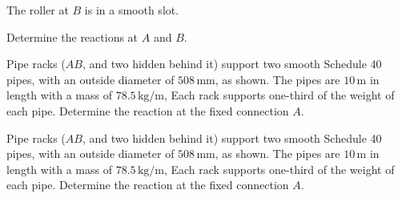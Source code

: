 \documentclass[9pt, xcolor={svgnames, x11names},professionalfonts]{beamer}
\def\scale{1}
\begin{document}
\begin{frame}{}
	\begin{myexam}{}{}
		\def\scale{0.55}
		
		\parb\centering
		The roller at $B$ is in a smooth slot.\par
		Determine the reactions at $A$ and $B$.
	\end{myexam}
\end{frame}
\begin{frame}{}
	\begin{myexer}{}{}
		\centering
		\def\scale{1}
		
		\parb
		Pipe racks ($AB$, and two hidden behind it) support two smooth Schedule 40 pipes, with an outside diameter of $508\,\text{mm}$, as shown. The pipes are $10\,\text{m}$ in length with a mass of $78.5\,\text{kg/m}$, Each rack supports one-third of the weight of each pipe.\parm 
		Determine the reaction at the fixed connection $A$.
		
	\end{myexer}
\end{frame}
\begin{frame}{}
	\begin{myexam}{}{}
		\centering
		\def\scale{1}
		
		\parb
		Pipe racks ($AB$, and two hidden behind it) support two smooth Schedule 40 pipes, with an outside diameter of $508\,\text{mm}$, as shown. The pipes are $10\,\text{m}$ in length with a mass of $78.5\,\text{kg/m}$, Each rack supports one-third of the weight of each pipe.\parm 
		Determine the reaction at the fixed connection $A$.
		
	\end{myexam}
\end{frame}
\end{document}
